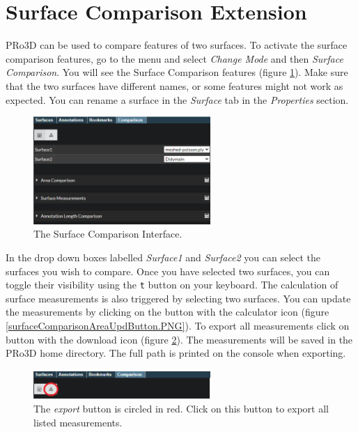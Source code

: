 \section{Surface Comparison Extension}

PRo3D can be used to compare features of two surfaces. To activate the surface comparison features, go to the menu and select \emph{Change Mode} and then \emph{Surface Comparison}. You will see the Surface Comparison features (figure  \ref{fig:surfaceComparison}). Make sure that the two surfaces have different names, or some features might not work as expected. You can rename a surface in the \emph{Surface} tab in the \emph{Properties} section.

\begin{figure}[h]
	\centering
	\includegraphics[width=0.6\textwidth]{pics/surfaceComparison.PNG}
	\caption[The surface comparison interface.]{The Surface Comparison Interface.}
	\label{fig:surfaceComparison}
\end{figure}

In the drop down boxes labelled \emph{Surface1} and \emph{Surface2} you can select the surfaces you wish to compare. Once you have selected two surfaces, you can toggle their visibility using the \texttt{t} button on your keyboard. The calculation of surface measurements is also triggered by selecting two surfaces. You can update the measurements by clicking on the button with the calculator icon (figure \ref{surfaceComparisonAreaUpdButton.PNG}). To export all measurements click on button with the download icon (figure \ref{surfaceComparisonAreaExpButton.PNG}). The measurements will be saved in the PRo3D home directory. The full path is printed on the console when exporting.

\begin{figure}[h]
	\centering
	\includegraphics[width=0.6\textwidth]{pics/surfaceComparisonAreaExpButton.PNG}
	\caption[The export button.]{The \emph{export} button is circled in red. Click on this button to export all listed measurements.}
	\label{surfaceComparisonAreaExpButton.PNG}
\end{figure}

